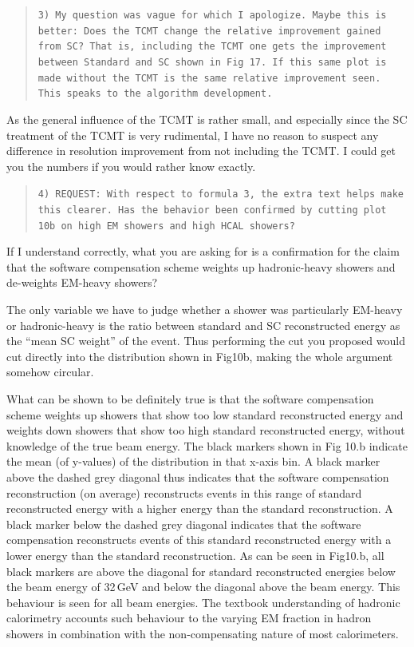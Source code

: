\documentclass[twoside,a4paper,12pt]{article}
\begin{document}
\begin{quote}\texttt{3) My question was vague for which I apologize.   Maybe this is better:
Does the TCMT change the relative improvement gained from SC?  That is,
including the TCMT one gets the improvement between Standard and SC shown
in Fig 17.  If this same plot is made without the TCMT is the same
relative improvement seen.   This speaks to the algorithm development.}\end{quote}

As the general influence of the TCMT is rather small, and especially since the SC treatment of the TCMT is very rudimental, I have no reason to suspect any difference in resolution improvement from not including the TCMT. I could get you the numbers if you would rather know exactly.

\begin{quote}\texttt{4) REQUEST: With respect to formula 3, the extra text helps make this
clearer.  Has the behavior been confirmed by cutting plot 10b on high EM
showers and high HCAL showers?}\end{quote}
If I understand correctly, what you are asking for is a confirmation for the claim that the software compensation scheme weights up hadronic-heavy showers and de-weights EM-heavy showers?
 
The only variable we have to judge whether a shower was particularly EM-heavy or hadronic-heavy is the ratio between standard and SC reconstructed energy as the ``mean SC weight'' of the event. Thus performing the cut you proposed would cut directly into the distribution shown in Fig10b, making the whole argument somehow circular.

What can be shown to be definitely true is that the software compensation scheme weights up showers that show too low standard reconstructed energy and weights down showers that show too high standard reconstructed energy, without knowledge of the true beam energy. The black markers shown in Fig 10.b indicate the mean (of y-values) of the distribution  in that x-axis bin. A black marker above the dashed grey diagonal thus indicates that the software compensation reconstruction (on average) reconstructs events in this range of standard reconstructed energy with a higher energy than the standard reconstruction. A black marker below the dashed grey diagonal indicates that the software compensation reconstructs events of this standard reconstructed energy with a lower energy than the standard reconstruction. As can be seen in Fig10.b, all black markers are above the diagonal for standard reconstructed energies below the beam energy of 32\,GeV and below the diagonal above the beam energy. 
This behaviour is seen for all beam energies. The textbook understanding of hadronic calorimetry accounts such behaviour to the varying EM fraction in hadron showers in combination with the non-compensating nature of most calorimeters.
\end{document}
